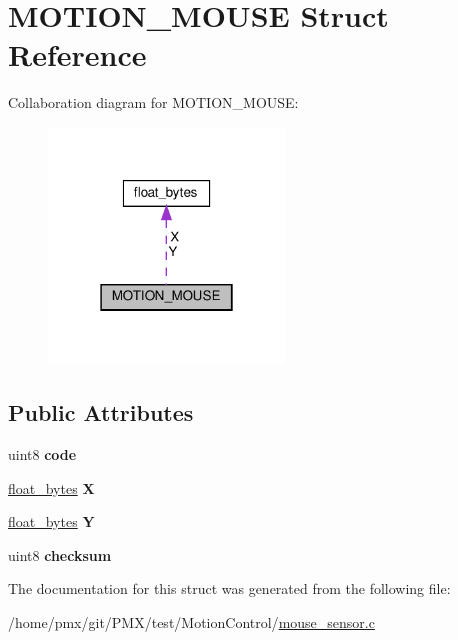 \hypertarget{structMOTION__MOUSE}{}\section{M\+O\+T\+I\+O\+N\+\_\+\+M\+O\+U\+SE Struct Reference}
\label{structMOTION__MOUSE}


Collaboration diagram for M\+O\+T\+I\+O\+N\+\_\+\+M\+O\+U\+SE\+:
\nopagebreak
\begin{figure}[H]
\begin{center}
\leavevmode
\includegraphics[width=178pt]{structMOTION__MOUSE__coll__graph}
\end{center}
\end{figure}
\subsection*{Public Attributes}
\begin{DoxyCompactItemize}
\item 
\mbox{\label{structMOTION__MOUSE_a78e464d5de622fbc453029539a10f06a}} 
uint8 {\bfseries code}
\item 
\mbox{\label{structMOTION__MOUSE_a4da11f85ba73a7c711924eb2880ca625}} 
\hyperlink{unionfloat__bytes}{float\+\_\+bytes} {\bfseries X}
\item 
\mbox{\label{structMOTION__MOUSE_aba3e5f75092b9876c40caedad82c9197}} 
\hyperlink{unionfloat__bytes}{float\+\_\+bytes} {\bfseries Y}
\item 
\mbox{\label{structMOTION__MOUSE_a5bbbb3bd8fffc2344786112d4c21bbbe}} 
uint8 {\bfseries checksum}
\end{DoxyCompactItemize}


The documentation for this struct was generated from the following file\+:\begin{DoxyCompactItemize}
\item 
/home/pmx/git/\+P\+M\+X/test/\+Motion\+Control/\hyperlink{mouse__sensor_8c}{mouse\+\_\+sensor.\+c}\end{DoxyCompactItemize}
